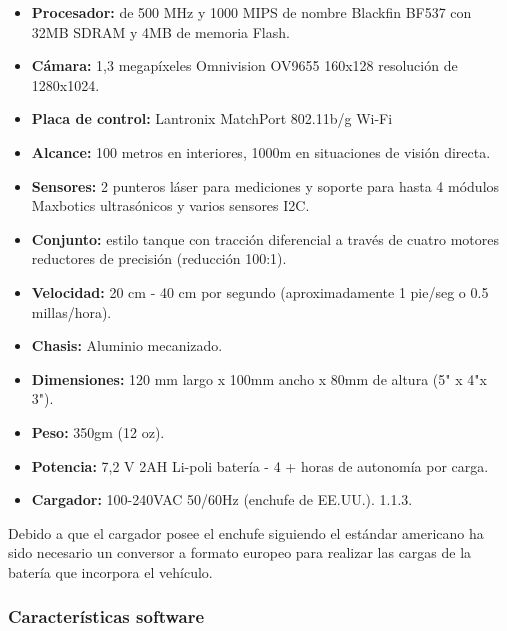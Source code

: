 \begin{itemize}

\item \textbf{Procesador:} de 500 MHz y 1000 MIPS de nombre Blackfin BF537 con 32MB SDRAM y 4MB de memoria Flash. 

\item \textbf{Cámara:} 1,3 megapíxeles Omnivision OV9655 160x128 resolución de 1280x1024. 

\item \textbf{Placa de control:} Lantronix MatchPort 802.11b/g Wi-Fi 
\item \textbf{Alcance:} 100 metros en interiores, 1000m en situaciones de visión directa. 
\item \textbf{Sensores:} 2 punteros láser para mediciones y soporte para hasta 4 módulos Maxbotics ultrasónicos y varios sensores I2C. 
\item \textbf{Conjunto:} estilo tanque con tracción diferencial a través de cuatro motores reductores de precisión (reducción 100:1). 
\item \textbf{Velocidad:} 20 cm - 40 cm por segundo (aproximadamente 1 pie/seg o 0.5 millas/hora). 
\item \textbf{Chasis:} Aluminio mecanizado. 
\item \textbf{Dimensiones:} 120 mm largo x 100mm ancho x 80mm de altura (5" x 4"x 3"). 
\item \textbf{Peso:} 350gm (12 oz). 
\item \textbf{Potencia:} 7,2 V 2AH Li-poli batería - 4 + horas de autonomía por carga. 
\item \textbf{Cargador:} 100-240VAC 50/60Hz (enchufe de EE.UU.). 1.1.3. 
\end{itemize}

Debido a que el cargador posee el enchufe siguiendo el estándar americano ha sido necesario un conversor a formato europeo para realizar las cargas de la batería que incorpora el vehículo.

\subsubsection{Características software} 

